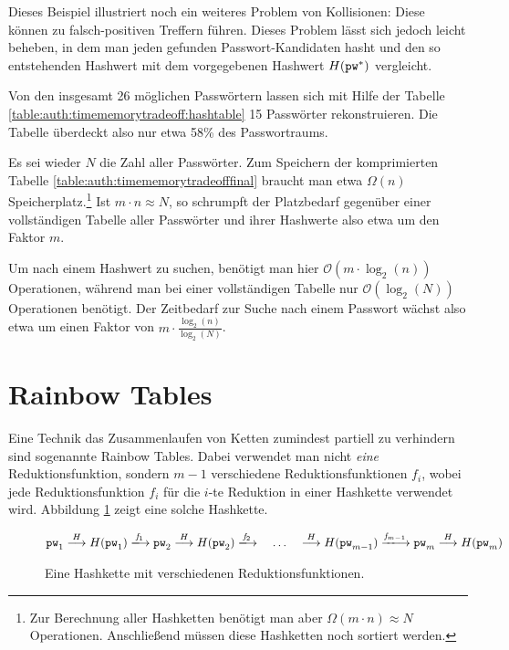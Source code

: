 Dieses Beispiel illustriert noch ein weiteres Problem von Kollisionen:
Diese können zu falsch-positiven Treffern führen. Dieses Problem lässt
sich jedoch leicht beheben, in dem man jeden gefunden
Passwort-Kandidaten hasht und den so entstehenden Hashwert mit dem
vorgegebenen Hashwert $H(\texttt{pw}^*)$ vergleicht.

Von den insgesamt 26 möglichen Passwörtern lassen sich mit Hilfe der
Tabelle \ref{table:auth:timememorytradeoff:hashtable} 15 Passwörter
rekonstruieren. Die Tabelle überdeckt also nur etwa 58\% des
Passwortraums.

Es sei wieder $N$ die Zahl aller Passwörter. Zum Speichern der
komprimierten Tabelle \ref{table:auth:timememorytradeofffinal} braucht
man etwa $\Omega(n)$ Speicherplatz.\footnote{Zur Berechnung aller
Hashketten benötigt man aber $\Omega(m \cdot n) \approx N$
Operationen. Anschließend müssen diese Hashketten noch sortiert werden.}
Ist $m \cdot n \approx N$, so schrumpft der Platzbedarf gegenüber einer
vollständigen Tabelle aller Passwörter und ihrer Hashwerte also etwa um
den Faktor $m$.

Um nach einem Hashwert zu suchen, benötigt man hier $\mathcal{O}(m \cdot
\log_2(n))$ Operationen, während man bei einer vollständigen Tabelle nur
$\mathcal{O}(\log_2(N))$ Operationen benötigt. Der Zeitbedarf zur Suche
nach einem Passwort wächst also etwa um einen Faktor von $m \cdot
\frac{\log_2(n)}{\log_2(N)}$.

\section{Rainbow Tables}
Eine Technik das Zusammenlaufen von Ketten zumindest partiell zu
verhindern sind sogenannte Rainbow Tables. Dabei verwendet man nicht
\emph{eine} Reduktionsfunktion, sondern $m-1$ verschiedene
Reduktionsfunktionen $f_i$, wobei jede Reduktionsfunktion $f_i$ für die
$i$-te Reduktion in einer Hashkette verwendet wird. Abbildung
\ref{fig:auth:rainbowhashchain} zeigt eine solche Hashkette.

\begin{figure}[h]
  \begin{equation*}
    \pw_1 \hasharrow H(\pw_1)
    \VRTF[1] \pw_2 \hasharrow H(\pw_2)
    \VRTF[2] %
    \quad \ldots \quad 
    \hasharrow H(\pw_{m-1})
    \VRTF[m-1] \pw_m \hasharrow H(\pw_m)
  \end{equation*}
  \caption{Eine Hashkette mit verschiedenen Reduktionsfunktionen.}
  \label{fig:auth:rainbowhashchain}
\end{figure}


